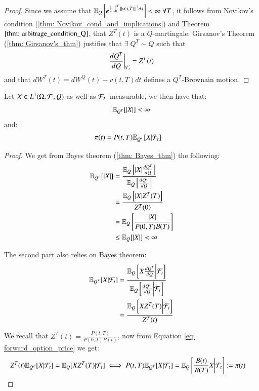 \begin{proof}
Since we assume that $\mathbb{E}_{Q}\left[e^{\frac{1}{2}\int_{0}^{T}\norm{v(s,T)}^{2}ds}\right] < \infty \; \forall T$, it follows from Novikov's condition (\ref{thm: Novikov_cond_and_implications}) and Theorem $\ref{thm: arbitrage_condition_Q}$, that $Z^{T}(t)$ is a $Q$-martingale. Girsanov's Theorem (\ref{thm: Girsanov's_thm}) justifies that  $\exists\; Q^{T}\sim Q$ such that 
$$
\frac{dQ^{T}}{dQ}\bigg{|}_{\mathcal{F}_{t}} = Z^{T}(t)
$$
and that $dW^{T}(t) = dW^{Q}(t) - v(t,T)dt$ defines a $Q^{T}$-Brownain motion. 
\end{proof}


\begin{proposition}
\label{prop: general_option_price}
Let $X \in L^{1}(\Omega, \mathcal{F}, Q)$ as well as $\mathcal{F}_{T}$-measurable, we then have that: 
\[
\mathbb{E}_{Q^{T}}[|X|] < \infty
\]
and: 
\begin{align*}
\pi(t) &= P(t,T)\mathbb{E}_{Q^{T}}[X|\mathcal{F}_{t}]    
\end{align*}
\end{proposition}

\begin{proof}
We get from Bayes theorem (\ref{thm: Bayes_thm}) the following: 
\begin{align*}
\mathbb{E}_{Q^{T}}[|X|] &= \frac{
\mathbb{E}_{Q}\left[|X|\frac{dQ^{T}}{dQ}\right]
}{
\mathbb{E}_{Q}\left[\frac{dQ^{T}}{dQ}\right]
} \\ 
&= 
\frac{
\mathbb{E}_{Q}\left[|X|Z^{T}(T)\right]
}{
Z^{T}(0)
} \\ 
&= 
\mathbb{E}_{Q}\left[
\frac{|X|}{P(0,T)B(T)}
\right] \\
&\leq \mathbb{E}_{Q}[|X|] < \infty
\end{align*}

The second part also relies on Bayes theorem: 
\begin{align}
\label{eq: forward_option_price}
\mathbb{E}_{Q^{T}}[X|\mathcal{F}_{t}]
&= 
\frac{
\mathbb{E}_{Q}\left[
X\frac{dQ^{T}}{dQ}\bigg{|}\mathcal{F}_{t}
\right]
}{
\mathbb{E}_{Q}\left[
\frac{dQ^{T}}{dQ}\bigg{|}\mathcal{F}_{t}
\right]
} \nonumber \\ 
&= 
\frac{
\mathbb{E}_{Q}\left[
XZ^{T}(T)\bigg{|}\mathcal{F}_{t}
\right]
}{
Z^{T}(t)
}
\end{align}

We recall that $Z^{T}(t) = \frac{P(t,T)}{P(0,T)B(t)}$, now from Equation \ref{eq: forward_option_price} we get: 
\begin{align*}
Z^{T}(t)\mathbb{E}_{Q^{T}}[X|\mathcal{F}_{t}] &= 
\mathbb{E}_{Q}[XZ^{T}(T)|\mathcal{F}_{t}]
\iff 
P(t,T)\mathbb{E}_{Q^{T}}[X|\mathcal{F}_{t}] = 
\mathbb{E}_{Q}\left[
\frac{B(t)}{B(T)}X\bigg{|}\mathcal{F}_{t}
\right] := \pi(t)
\end{align*}


\end{proof}


